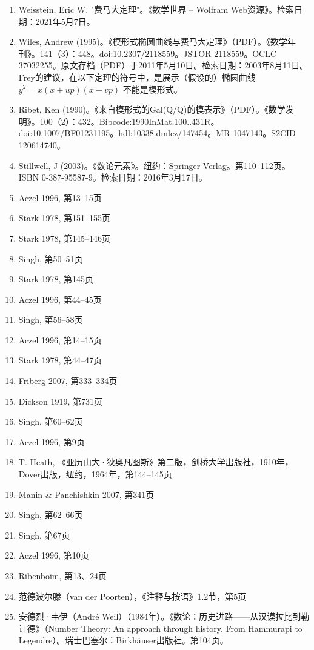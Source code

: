 \begin{enumerate}
\item Weisstein, Eric W. "费马大定理"。《数学世界 – Wolfram Web资源》。检索日期：2021年5月7日。  
\item Wiles, Andrew (1995)。《模形式椭圆曲线与费马大定理》（PDF）。《数学年刊》。141（3）：448。doi:10.2307/2118559。JSTOR 2118559。OCLC 37032255。原文存档（PDF）于2011年5月10日。检索日期：2003年8月11日。Frey的建议，在以下定理的符号中，是展示（假设的）椭圆曲线 \( y^2 = x(x + up)(x - vp) \) 不能是模形式。  
\item Ribet, Ken (1990)。《来自模形式的Gal(Q/Q)的模表示》（PDF）。《数学发明》。100（2）：432。Bibcode:1990InMat.100..431R。doi:10.1007/BF01231195。hdl:10338.dmlcz/147454。MR 1047143。S2CID 120614740。  
\item Stillwell, J (2003)。《数论元素》。纽约：Springer-Verlag。第110–112页。ISBN 0-387-95587-9。检索日期：2016年3月17日。
\item Aczel 1996, 第13–15页  
\item Stark 1978, 第151–155页  
\item Stark 1978, 第145–146页  
\item Singh, 第50–51页  
\item Stark 1978, 第145页  
\item Aczel 1996, 第44–45页  
\item Singh, 第56–58页  
\item Aczel 1996, 第14–15页  
\item Stark 1978, 第44–47页  
\item Friberg 2007, 第333–334页  
\item Dickson 1919, 第731页  
\item Singh, 第60–62页  
\item Aczel 1996, 第9页  
\item T. Heath, 《亚历山大·狄奥凡图斯》第二版，剑桥大学出版社，1910年，Dover出版，纽约，1964年，第144–145页  
\item Manin & Panchishkin 2007, 第341页  
\item Singh, 第62–66页  
\item Singh, 第67页  
\item Aczel 1996, 第10页  
\item Ribenboim, 第13、24页
\item 范德波尔滕（van der Poorten），《注释与按语》1.2节，第5页
\item 安德烈·韦伊（André Weil）（1984年）。《数论：历史进路——从汉谟拉比到勒让德》（Number Theory: An approach through history. From Hammurapi to Legendre）。瑞士巴塞尔：Birkhäuser出版社。第104页。

\end{enumerate}
